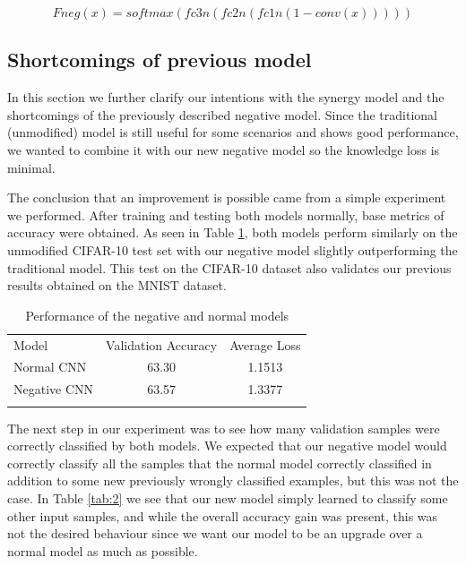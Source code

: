 \documentclass[b5paper]{book}
\begin{document}
\begin{equation}\label{eq:3}
Fneg(x) = softmax(fc3n(fc2n(fc1n(1 - conv(x)))))
\end{equation}

\subsection{Shortcomings of previous model}
\label{shortcomings}

In this section we further clarify our intentions with the synergy model and the shortcomings of the previously described negative model. Since the traditional (unmodified) model is still useful for some scenarios and shows good performance, we wanted to combine it with our new negative model so the knowledge loss is minimal. 

The conclusion that an improvement is possible came from a simple experiment we performed. After training and testing both models normally, base metrics of accuracy were obtained. As seen in Table \ref{tab:1}, both models perform similarly on the unmodified CIFAR-10 test set with our negative model slightly outperforming the traditional model. This test on the CIFAR-10 dataset also validates our previous results obtained on the MNIST dataset. 

\begin{table}
\centering
\caption{Performance of the negative and normal models}
\label{tab:1}
\begin{tabular}{lcc}
\hline\noalign{\smallskip}
Model & Validation Accuracy & Average Loss  \\
\noalign{\smallskip}\hline\noalign{\smallskip}
Normal CNN & 63.30 & 1.1513 \\
Negative CNN & 63.57 & 1.3377 \\
\noalign{\smallskip}\hline
\end{tabular}
\end{table}

The next step in our experiment was to see how many validation samples were correctly classified by both models. We expected that our negative model would correctly classify all the samples that the normal model correctly classified in addition to some new previously wrongly classified examples, but this was not the case. In Table \ref{tab:2} we see that our new model simply learned to classify some other input samples, and while the overall accuracy gain was present, this was not the desired behaviour since we want our model to be an upgrade over a normal model as much as possible. 
\end{document}
